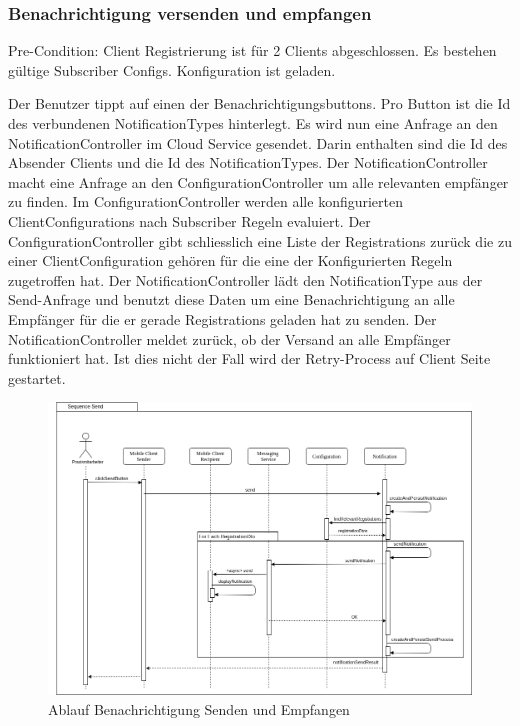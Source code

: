 \subsubsection*{Benachrichtigung versenden und empfangen}

Pre-Condition: Client Registrierung ist für 2 Clients abgeschlossen. Es bestehen gültige Subscriber Configs. Konfiguration ist geladen.

Der Benutzer tippt auf einen der Benachrichtigungsbuttons.
Pro Button ist die Id des verbundenen NotificationTypes hinterlegt.
Es wird nun eine Anfrage an den NotificationController im Cloud Service gesendet.
Darin enthalten sind die Id des Absender Clients und die Id des NotificationTypes.
Der NotificationController macht eine Anfrage an den ConfigurationController um alle relevanten empfänger zu finden.
Im ConfigurationController werden alle konfigurierten ClientConfigurations nach Subscriber Regeln evaluiert.
Der ConfigurationController gibt schliesslich eine Liste der Registrations zurück die zu einer ClientConfiguration gehören für die eine der Konfigurierten Regeln zugetroffen hat.
Der NotificationController lädt den NotificationType aus der Send-Anfrage und benutzt diese Daten um eine Benachrichtigung an alle Empfänger für die er gerade Registrations geladen hat zu senden.
Der NotificationController meldet zurück, ob der Versand an alle Empfänger funktioniert hat.
Ist dies nicht der Fall wird der Retry-Process auf Client Seite gestartet.

\begin{figure}[h]
    \centering
    \begin{minipage}[b]{0.9\textwidth}
        \includegraphics[width=\textwidth]{graphics/Sequence_Notification_Send}
        \caption{Ablauf Benachrichtigung Senden und Empfangen}
    \end{minipage}
\end{figure}


